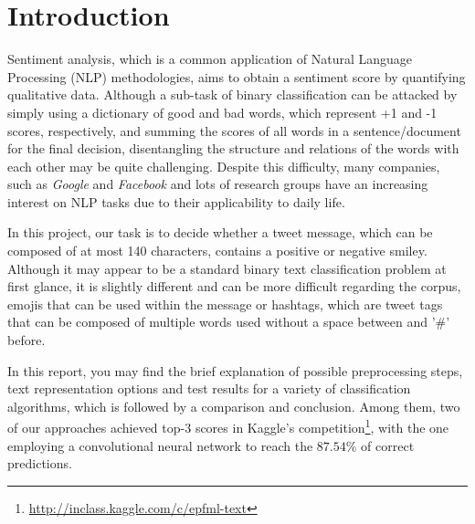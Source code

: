 \section{Introduction}
Sentiment analysis, which is a common application of Natural Language Processing (NLP) methodologies, aims to obtain a sentiment score by quantifying qualitative data.
Although a sub-task of binary classification can be attacked by simply using a dictionary of good and bad words, which represent +1 and -1 scores, respectively, and summing the scores of all words in a sentence/document for the final decision, disentangling the structure and relations of the words with each other may be quite challenging.
Despite this difficulty, many companies, such as \textit{Google} and \textit{Facebook} and lots of research groups have an increasing interest on NLP tasks due to their applicability to daily life.

In this project, our task is to decide whether a tweet message, which can be composed of at most 140 characters, contains a positive or negative smiley.
Although it may appear to be a standard binary text classification problem at first glance, it is slightly different and can be more difficult regarding the corpus, emojis that can be used within the message or hashtags, which are tweet tags that can be composed of multiple words used without a space between and '\#'  before.

In this report, you may find the brief explanation of possible preprocessing steps, text representation options and test results for a variety of classification algorithms, which is followed by a comparison and conclusion.
Among them, two of our approaches achieved top-$3$ scores in Kaggle's competition\footnote{\url{http://inclass.kaggle.com/c/epfml-text}},
with the one employing a convolutional neural network to reach the
$87.54\%$ of correct predictions.

\label{sec:Introduction}